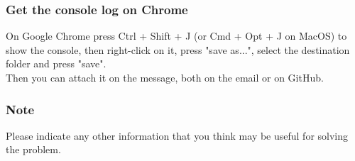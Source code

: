 \documentclass[ManualeUtente]{subfiles}
\begin{document}
\subsubsection{Get the console log on Chrome}
On Google Chrome press Ctrl + Shift + J (or Cmd + Opt + J on MacOS) to show the console, then right-click on it, press "save as...", select the destination folder and press "save". \\
Then you can attach it on the message, both on the email or on GitHub.

\subsubsection{Note}
Please indicate any other information that you think may be useful for solving the problem.
\end{document}
